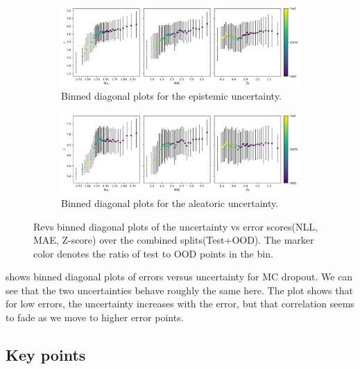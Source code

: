 \begin{figure}[htbp]
  \centering
    \begin{subfigure}[b]{\textwidth}
        \includegraphics[width=\textwidth]{Experiments/figs/binned/revs_dropout_epistemic.png}
        \caption{Binned diagonal plots for the epistemic uncertainty.}
    \end{subfigure}
    
    \begin{subfigure}[b]{\textwidth}
        \includegraphics[width=\textwidth]{Experiments/figs/binned/revs_dropout_aleatoric.png}
        \caption{Binned diagonal plots for the aleatoric uncertainty.}
  \end{subfigure}
    \caption[Revs error-uncertainty diagonal plots for MC dropout]{Revs binned diagonal plots of the  uncertainty vs error scores(NLL, MAE, Z-score) over the combined splits(Test+OOD). The marker color denotes the ratio of test to OOD points in the bin.}
    \label{fig:revs_dropout_uncertainty_corr}
\end{figure}

 shows binned diagonal plots of errors versus uncertainty for MC dropout. We can see that the two uncertainties behave roughly the same here. The plot shows that for low errors, the uncertainty increases with the error, but that correlation seems to fade as we move to higher error points. 


\subsection{Key points}

